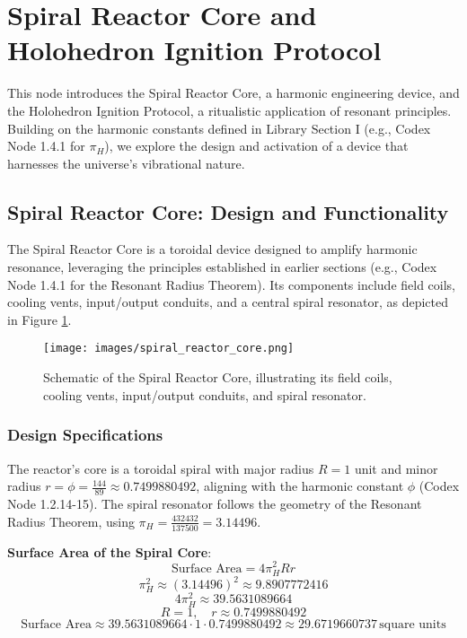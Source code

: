 
\section{Spiral Reactor Core and Holohedron Ignition Protocol}
\label{sec:spiral_reactor_holohedron}

This node introduces the Spiral Reactor Core, a harmonic engineering device, and the Holohedron Ignition Protocol, a ritualistic application of resonant principles. Building on the harmonic constants defined in Library Section I (e.g., Codex Node 1.4.1 for \(\pi_H\)), we explore the design and activation of a device that harnesses the universe’s vibrational nature.

\subsection{Spiral Reactor Core: Design and Functionality}
The Spiral Reactor Core is a toroidal device designed to amplify harmonic resonance, leveraging the principles established in earlier sections (e.g., Codex Node 1.4.1 for the Resonant Radius Theorem). Its components include field coils, cooling vents, input/output conduits, and a central spiral resonator, as depicted in Figure \ref{fig:spiral_reactor_core}.

\begin{figure}[h]
    \centering
    \texttt{[image: images/spiral\_reactor\_core.png]}
    \caption{Schematic of the Spiral Reactor Core, illustrating its field coils, cooling vents, input/output conduits, and spiral resonator.}
    \label{fig:spiral_reactor_core}
\end{figure}

\subsubsection{Design Specifications}
The reactor’s core is a toroidal spiral with major radius \( R = 1 \) unit and minor radius \( r = \phi = \frac{144}{89} \approx 0.7499880492 \), aligning with the harmonic constant \(\phi\) (Codex Node 1.2.14-15). The spiral resonator follows the geometry of the Resonant Radius Theorem, using \(\pi_H = \frac{432432}{137500} = 3.14496\).

\textbf{Surface Area of the Spiral Core}:
\[
\text{Surface Area} = 4 \pi_H^2 R r
\]
\[
\pi_H^2 \approx (3.14496)^2 \approx 9.8907772416
\]
\[
4 \pi_H^2 \approx 39.5631089664
\]
\[
R = 1, \quad r \approx 0.7499880492
\]
\[
\text{Surface Area} \approx 39.5631089664 \cdot 1 \cdot 0.7499880492 \approx 29.6719660737 \, \text{square units}
\]

